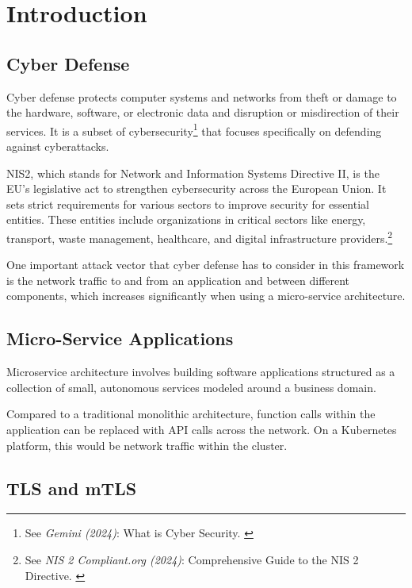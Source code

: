 %
%

\pagebreak
\section{Introduction}

\onehalfspacing

\subsection{Cyber Defense}

Cyber defense protects computer systems and networks from theft or damage to the hardware, software, or electronic data and disruption or misdirection of their services. It is a subset of cybersecurity\footnote{See \textit{Gemini (2024)}: What is Cyber Security. \cite{bardCybersec}} that focuses specifically on defending against cyberattacks.

NIS2, which stands for Network and Information Systems Directive II, is the EU's legislative act to strengthen cybersecurity across the European Union. It sets strict requirements for various sectors to improve security for essential entities. These entities include organizations in critical sectors like energy, transport, waste management, healthcare, and digital infrastructure providers.\footnote{See \textit{NIS 2 Compliant.org (2024)}: Comprehensive Guide to the NIS 2 Directive. \cite{nisGuide}}

One important attack vector that cyber defense has to consider in this framework is the network traffic to and from an application and between different components, which increases significantly when using a micro-service architecture.

\subsection{Micro-Service Applications}

Microservice architecture involves building software applications structured as a collection of small, autonomous services modeled around a business domain.

Compared to a traditional monolithic architecture, function calls within the application can be replaced with API calls across the network. On a Kubernetes platform, this would be network traffic within the cluster.

\subsection{TLS and mTLS}

